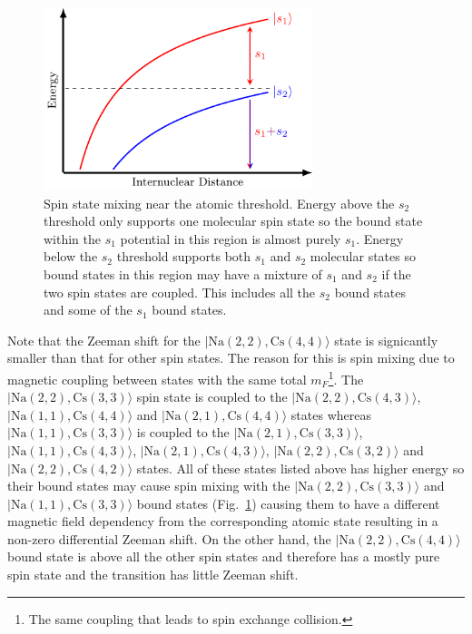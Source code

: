 \begin{figure}
  \centering
  \includegraphics[width=0.7\textwidth]{figures/raman_spectroscopy_spin_mixing.pdf}
  \caption[Spin state mixing near the atomic threshold.]{
    Spin state mixing near the atomic threshold.
    Energy above the $s_2$ threshold only supports one molecular spin state
    so the bound state within the $s_1$ potential in this region is
    almost purely $s_1$.
    Energy below the $s_2$ threshold supports both $s_1$ and $s_2$ molecular states
    so bound states in this region may have a mixture of $s_1$ and $s_2$
    if the two spin states are coupled.
    This includes all the $s_2$ bound states and some of the $s_1$ bound states.
    \label{fig:raman-spectroscopy:spin-mixing}}
\end{figure}

Note that the Zeeman shift for the $|\mathrm{Na(2, 2),Cs(4, 4)}\rangle$ state
is signicantly smaller than that for other spin states.
The reason for this is spin mixing due to magnetic coupling between states
with the same total $m_F$\footnote{The same coupling that leads to spin exchange collision.}.
The $|\mathrm{Na(2, 2),Cs(3, 3)}\rangle$ spin state is coupled to the
$|\mathrm{Na(2, 2),Cs(4, 3)}\rangle$, $|\mathrm{Na(1, 1),Cs(4, 4)}\rangle$
and $|\mathrm{Na(2, 1),Cs(4, 4)}\rangle$ states
whereas $|\mathrm{Na(1, 1),Cs(3, 3)}\rangle$ is coupled to the
$|\mathrm{Na(2, 1),Cs(3, 3)}\rangle$, $|\mathrm{Na(1, 1),Cs(4, 3)}\rangle$,
$|\mathrm{Na(2, 1),Cs(4, 3)}\rangle$, $|\mathrm{Na(2, 2),Cs(3, 2)}\rangle$
and $|\mathrm{Na(2, 2),Cs(4, 2)}\rangle$ states.
All of these states listed above has higher energy so their bound states
may cause spin mixing with the $|\mathrm{Na(2, 2),Cs(3, 3)}\rangle$ and
$|\mathrm{Na(1, 1),Cs(3, 3)}\rangle$ bound states (Fig.~\ref{fig:raman-spectroscopy:spin-mixing})
causing them to have a different magnetic field dependency from the corresponding atomic state
resulting in a non-zero differential Zeeman shift.
On the other hand, the $|\mathrm{Na(2, 2),Cs(4, 4)}\rangle$ bound state is above
all the other spin states and therefore has a mostly pure spin state
and the transition has little Zeeman shift.

